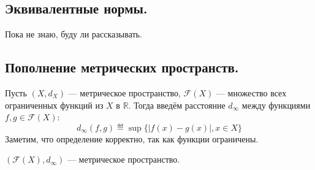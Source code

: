 \documentclass[11pt]{article}
\begin{document}
    \subsection{Эквивалентные нормы.}
    Пока не знаю, буду ли рассказывать.

    \subsection{Пополнение метрических пространств.}

    \begin{definition}
    Пусть $(X, d_X)$ --- метрическое пространство, $\mathcal{F}(X)$ --- множество всех ограниченных функций из $X$ в $\mathbb{R}$. Тогда введём расстояние $d_{\infty}$ между функциями $f, g \in \mathcal{F}(X)$:
    \begin{equation*}
        d_{\infty}(f, g) \eqdef \sup\{|f(x) - g(x)|, x \in X\}
    \end{equation*}
    Заметим, что определение корректно, так как функции ограничены.
    \end{definition}

    \begin{lemma}

    $(\mathcal{F}(X), d_{\infty})$ --- метрическое пространство.

    \end{lemma}
\end{document}
